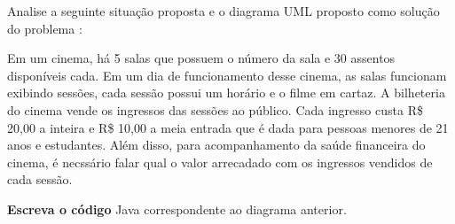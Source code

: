 \documentclass{lib/eng_softdoc}
\begin{document}
\problem Analise a seguinte situação proposta e o diagrama UML proposto como solução do problema :
		
		Em um cinema, há 5 salas que possuem o número da sala e 30 assentos disponíveis cada. 
    Em um dia de funcionamento desse cinema, as salas funcionam exibindo sessões, cada sessão possui um horário e o filme em cartaz.
    A bilheteria do cinema vende os ingressos das sessões ao público.
    Cada ingresso custa R\$ 20,00 a inteira e R\$ 10,00 a meia entrada que é dada para pessoas menores de 21 anos e
    estudantes. Além disso, para acompanhamento da saúde financeira do cinema, é necssário falar qual o valor arrecadado com os ingressos vendidos
    de cada sessão.

\vspace{0.5cm}

\vspace{0.5cm}
		\textbf{Escreva o código} Java correspondente ao diagrama anterior.

\answer
\end{document}
